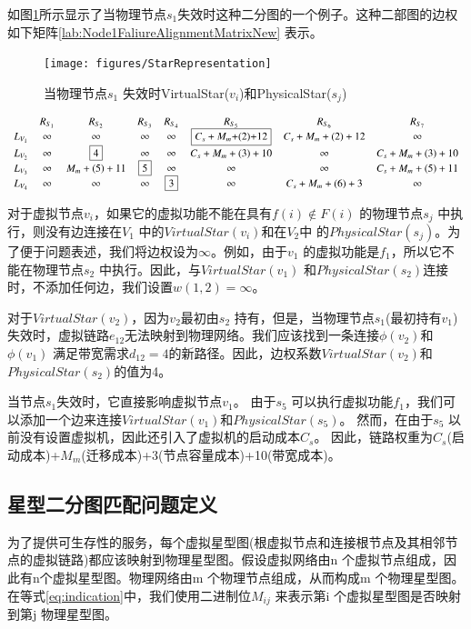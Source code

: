 如图\ref{fig:StarRepresentation}所示显示了当物理节点$s_1$失效时这种二分图的一个例子。这种二部图的边权如下矩阵\ref{lab:Node1FaliureAlignmentMatrixNew} 表示。
\begin{figure}
\centering
\texttt{[image: figures/StarRepresentation]}\\
  \caption{当物理节点$s_1$ 失效时VirtualStar($v_i$)和PhysicalStar($s_j$)}\label{fig:StarRepresentation}
\end{figure}

\begin{equation}
\small{
 {\begin{array}{*{20}{c}}
&R_{S_{1}}&R_{S_{2}}&R_{S_3}&R_{S_4}&R_{S_5}&R_{S_6}&R_{S_{7}}\\
{L_{V_1}}&\infty&\infty&\infty&\infty&\fbox{$C_{s}+M_{m}$+(2)+12}&C_{s}+M_{m}+(2)+12&\infty\\
L_{V_2}&\infty&\fbox{4}&\infty&\infty&C_{s}+M_{m}+(3)+10&\infty&C_{s}+M_{m}+(3)+10\\
L_{V_3}&\infty&M_{m}+(5)+11&\fbox{5}&\infty&\infty&\infty&C_{s}+M_{m}+(5)+11\\
L_{V_4}&\infty&\infty&\infty&\fbox{3}&\infty&C_{s}+M_{m}+(6)+3&\infty\\
\end{array}}
}
\label{lab:Node1FaliureAlignmentMatrixNew}
\end{equation}


对于虚拟节点$v_i$，如果它的虚拟功能不能在具有$f(i) \notin F(i)$ 的物理节点$s_j$ 中执行，则没有边连接在$V_1$ 中的$VirtualStar(v_i)$和在$V_2$中 的$PhysicalStar(s_j)$。为了便于问题表述，我们将边权设为$\infty $。例如，由于$v_1$ 的虚拟功能是$f_1$，所以它不能在物理节点$s_2$ 中执行。因此，与$VirtualStar(v_1)$ 和$PhysicalStar(s_2)$连接时，不添加任何边，我们设置$w(1,2)=\infty$。

对于$VirtualStar(v_2)$，因为$v_2$最初由$s_2$ 持有，但是，当物理节点$s_1$(最初持有$v_1$)失效时，虚拟链路$e_{12}$无法映射到物理网络。我们应该找到一条连接$\phi(v_2)$和$\phi(v_1)$ 满足带宽需求$d_{12}=4$的新路径。因此，边权系数$VirtualStar(v_2)$和$PhysicalStar(s_2)$的值为4。

当节点$s_1$失效时，它直接影响虚拟节点$v_1$。 由于$s_5$ 可以执行虚拟功能$f_1$，我们可以添加一个边来连接$VirtualStar(v_1)$和$PhysicalStar(s_5)$。 然而，在由于$s_5$ 以前没有设置虚拟机，因此还引入了虚拟机的启动成本$C_s$。 因此，链路权重为$C_s$(启动成本)+$M_m$(迁移成本)+3(节点容量成本)+10(带宽成本)。

\subsection{星型二分图匹配问题定义}
为了提供可生存性的服务，每个虚拟星型图(根虚拟节点和连接根节点及其相邻节点的虚拟链路)都应该映射到物理星型图。假设虚拟网络由n 个虚拟节点组成，因此有n个虚拟星型图。物理网络由m 个物理节点组成，从而构成m 个物理星型图。在等式\ref{eq:indication}中，我们使用二进制位$M_{ij}$ 来表示第i 个虚拟星型图是否映射到第j 物理星型图。

